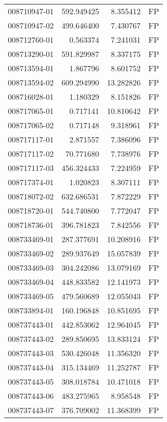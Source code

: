 \begin{tabular}{lrrl}
008710947-01 &  592.949425 &     8.355412 &   FP \\
008710947-02 &  499.646400 &     7.430767 &   FP \\
008712760-01 &    0.563374 &     7.241031 &   FP \\
008713290-01 &  591.829987 &     8.337175 &   FP \\
008713594-01 &    1.867796 &     8.601752 &   FP \\
008713594-02 &  609.294990 &    13.282826 &   FP \\
008716028-01 &    1.180329 &     8.151826 &   FP \\
008717065-01 &    0.717141 &    10.810642 &   FP \\
008717065-02 &    0.717148 &     9.318961 &   FP \\
008717117-01 &    2.871557 &     7.386096 &   FP \\
008717117-02 &   70.771680 &     7.738976 &   FP \\
008717117-03 &  456.324433 &     7.224959 &   FP \\
008717374-01 &    1.020823 &     8.307111 &   FP \\
008718072-02 &  632.686531 &     7.872229 &   FP \\
008718720-01 &  544.740800 &     7.772047 &   FP \\
008718736-01 &  396.781823 &     7.842556 &   FP \\
008733469-01 &  287.377691 &    10.208916 &   FP \\
008733469-02 &  289.937649 &    15.057839 &   FP \\
008733469-03 &  304.242086 &    13.079169 &   FP \\
008733469-04 &  448.833582 &    12.141973 &   FP \\
008733469-05 &  479.560689 &    12.055043 &   FP \\
008733894-01 &  160.196848 &    10.851695 &   FP \\
008737443-01 &  442.853062 &    12.964045 &   FP \\
008737443-02 &  289.850695 &    13.833124 &   FP \\
008737443-03 &  530.426048 &    11.356320 &   FP \\
008737443-04 &  315.134469 &    11.252787 &   FP \\
008737443-05 &  308.018784 &    10.471018 &   FP \\
008737443-06 &  483.275965 &     8.958548 &   FP \\
008737443-07 &  376.709002 &    11.368399 &   FP \\

\end{tabular}
